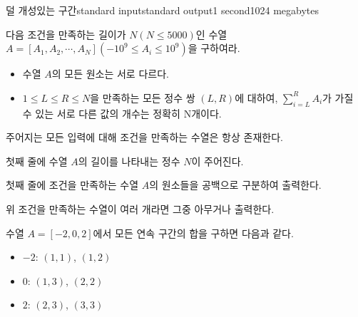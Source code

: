 \begin{problem}{덜 개성있는 구간}{standard input}{standard output}{1 second}{1024 megabytes}

다음 조건을 만족하는 길이가 $N(N \le 5000)$인 수열 $A = [A_1, A_2, \cdots, A_N](-10^{9} \le A_i \le 10^{9})$을 구하여라.

\begin{itemize}
    \item 수열 $A$의 모든 원소는 서로 다르다.
    \item $1 \le L \le R \le N$을 만족하는 모든 정수 쌍 $(L, R)$에 대하여, $\sum_{i=L}^R A_i$가 가질 수 있는 서로 다른 값의 개수는 정확히 N개이다.
\end{itemize}

주어지는 모든 입력에 대해 조건을 만족하는 수열은 항상 존재한다.

\InputFile
첫째 줄에 수열 $A$의 길이를 나타내는 정수 $N$이 주어진다.

\OutputFile
첫째 줄에 조건을 만족하는 수열 $A$의 원소들을 공백으로 구분하여 출력한다.

위 조건을 만족하는 수열이 여러 개라면 그중 아무거나 출력한다.

\Examples

\begin{example}
%
%
\end{example}

\Note
수열 $A = [-2, 0, 2]$에서 모든 연속 구간의 합을 구하면 다음과 같다.

\begin{itemize}
    \item $-2$: $(1, 1)$, $(1, 2)$
    \item $0$: $(1, 3)$, $(2, 2)$
    \item $2$: $(2, 3)$, $(3, 3)$
\end{itemize}

\end{problem}

